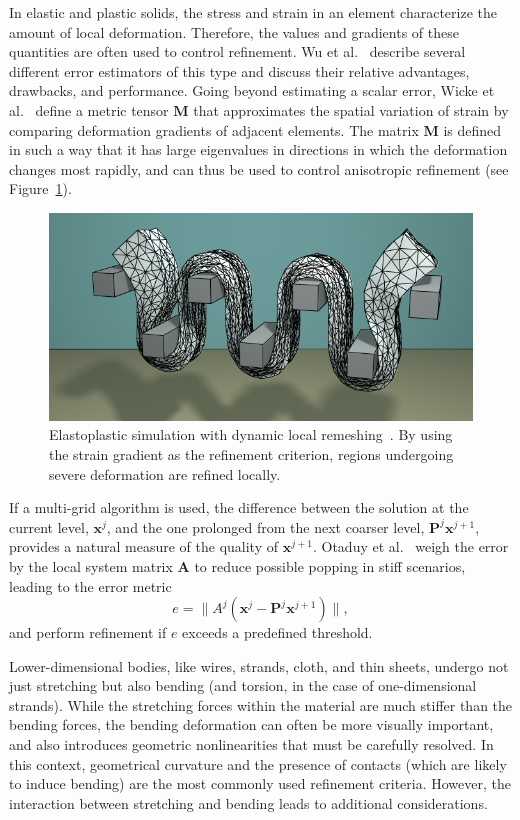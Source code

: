In elastic and plastic solids, the stress and strain in an element characterize the amount of local deformation.
Therefore, the values and gradients of these quantities are often used to control refinement.
Wu et al.~\cite{Wu2001} describe several different error estimators of this type and discuss their relative advantages, drawbacks, and performance.
Going beyond estimating a scalar error, Wicke et al.~\cite{Wicke2010} define a metric tensor $\mathbf M$ that approximates the spatial variation of strain by comparing deformation gradients of adjacent elements.
The matrix $\mathbf M$ is defined in such a way that it has large eigenvalues in directions in which the deformation changes most rapidly, and can thus be used to control anisotropic refinement (see Figure~\ref{fig:Wicke2010}).
\begin{figure}[!t]
  \centering
  \includegraphics[width=0.8\linewidth]{images/starAdaptivity-cgf2016/mesh-plastic.png}
  \caption[STAR adaptivity: Tetrahedral remeshing]{Elastoplastic simulation with dynamic local remeshing~\cite{Wicke2010}. By using the strain gradient as the refinement criterion, regions undergoing severe deformation are refined locally.}
  \label{fig:Wicke2010}
\end{figure}

If a multi-grid algorithm is used, the difference between the solution at the current level, $\mathbf x^j$, and the one prolonged from the next coarser level, $\mathbf P^j\mathbf x^{j+1}$, provides a natural measure of the quality of $\mathbf x^{j+1}$.
Otaduy et al.~\cite{Otaduy2007} weigh the error by the local system matrix $\mathbf A$ to reduce possible popping in stiff scenarios, leading to the error metric
\begin{equation}
	e = \|A^j(\mathbf x^j-\mathbf P^j\mathbf x^{j+1})\|,
\end{equation}
and perform refinement if $e$ exceeds a predefined threshold.

Lower-dimensional bodies, like wires, strands, cloth, and thin sheets, undergo not just stretching but also bending (and torsion, in the case of one-dimensional strands).
While the stretching forces within the material are much stiffer than the bending forces, the bending deformation can often be more visually important, and also introduces geometric nonlinearities that must be carefully resolved.
In this context, geometrical curvature and the presence of contacts (which are likely to induce bending) are the most commonly used refinement criteria.
However, the interaction between stretching and bending leads to additional considerations.

